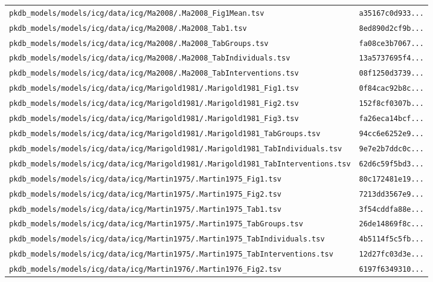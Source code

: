 \begin{longtable}{ll}
\texttt{pkdb\_models/models/icg/data/icg/Ma2008/.Ma2008\_Fig1Mean.tsv} & \texttt{a35167c0d933...} \\
\texttt{pkdb\_models/models/icg/data/icg/Ma2008/.Ma2008\_Tab1.tsv} & \texttt{8ed890d2cf9b...} \\
\texttt{pkdb\_models/models/icg/data/icg/Ma2008/.Ma2008\_TabGroups.tsv} & \texttt{fa08ce3b7067...} \\
\texttt{pkdb\_models/models/icg/data/icg/Ma2008/.Ma2008\_TabIndividuals.tsv} & \texttt{13a5737695f4...} \\
\texttt{pkdb\_models/models/icg/data/icg/Ma2008/.Ma2008\_TabInterventions.tsv} & \texttt{08f1250d3739...} \\
\texttt{pkdb\_models/models/icg/data/icg/Marigold1981/.Marigold1981\_Fig1.tsv} & \texttt{0f84cac92b8c...} \\
\texttt{pkdb\_models/models/icg/data/icg/Marigold1981/.Marigold1981\_Fig2.tsv} & \texttt{152f8cf0307b...} \\
\texttt{pkdb\_models/models/icg/data/icg/Marigold1981/.Marigold1981\_Fig3.tsv} & \texttt{fa26eca14bcf...} \\
\texttt{pkdb\_models/models/icg/data/icg/Marigold1981/.Marigold1981\_TabGroups.tsv} & \texttt{94cc6e6252e9...} \\
\texttt{pkdb\_models/models/icg/data/icg/Marigold1981/.Marigold1981\_TabIndividuals.tsv} & \texttt{9e7e2b7ddc0c...} \\
\texttt{pkdb\_models/models/icg/data/icg/Marigold1981/.Marigold1981\_TabInterventions.tsv} & \texttt{62d6c59f5bd3...} \\
\texttt{pkdb\_models/models/icg/data/icg/Martin1975/.Martin1975\_Fig1.tsv} & \texttt{80c172481e19...} \\
\texttt{pkdb\_models/models/icg/data/icg/Martin1975/.Martin1975\_Fig2.tsv} & \texttt{7213dd3567e9...} \\
\texttt{pkdb\_models/models/icg/data/icg/Martin1975/.Martin1975\_Tab1.tsv} & \texttt{3f54cddfa88e...} \\
\texttt{pkdb\_models/models/icg/data/icg/Martin1975/.Martin1975\_TabGroups.tsv} & \texttt{26de14869f8c...} \\
\texttt{pkdb\_models/models/icg/data/icg/Martin1975/.Martin1975\_TabIndividuals.tsv} & \texttt{4b5114f5c5fb...} \\
\texttt{pkdb\_models/models/icg/data/icg/Martin1975/.Martin1975\_TabInterventions.tsv} & \texttt{12d27fc03d3e...} \\
\texttt{pkdb\_models/models/icg/data/icg/Martin1976/.Martin1976\_Fig2.tsv} & \texttt{6197f6349310...} \\

\end{longtable}
